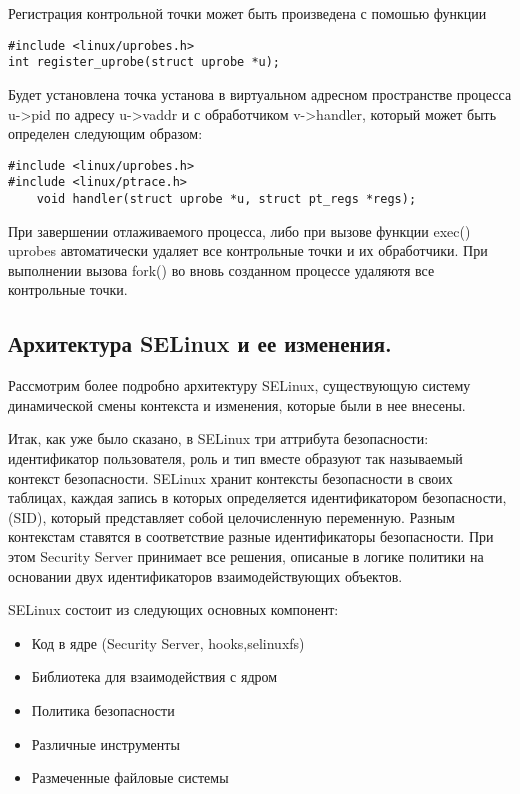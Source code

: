 Регистрация контрольной точки может быть произведена с помошью функции
 

\bigskip 
\begin{lstlisting}
#include <linux/uprobes.h>
int register_uprobe(struct uprobe *u); 
\end{lstlisting}

Будет установлена точка установа в виртуальном адресном пространстве 
процесса u->pid по адресу u->vaddr и с обработчиком v->handler, который
 может быть определен следующим образом: 

\begin{lstlisting}
#include <linux/uprobes.h>
#include <linux/ptrace.h>
	void handler(struct uprobe *u, struct pt_regs *regs);
\end{lstlisting}

\bigskip
При завершении отлаживаемого процесса, либо при вызове функции exec() 
uprobes автоматически удаляет все контрольные точки и их обработчики. 
При выполнении вызова fork() во вновь созданном процессе удаляютя все 
контрольные точки. 

\bigskip
\subsection{Архитектура SELinux и ее изменения.}

Рассмотрим более подробно архитектуру SELinux, существующую 
систему динамической смены контекста и изменения, которые были 
в нее внесены. 

Итак, как уже было сказано, в SELinux три аттрибута безопасности: 
идентификатор пользователя, роль и тип вместе образуют так называемый 
контекст безопасности. SELinux хранит контексты безопасности в своих 
таблицах, каждая запись в которых определяется идентификатором 
безопасности, (SID), который представляет собой целочисленную 
переменную. Разным контекстам ставятся в соответствие разные 
идентификаторы безопасности. При этом Security Server принимает все 
решения, описаные в логике политики на основании двух идентификаторов 
взаимодействующих объектов. 

SELinux состоит из следующих основных компонент:
\begin{itemize}
\item Код в ядре (Security Server, hooks,selinuxfs)
\item Библиотека для взаимодействия с ядром
\item Политика безопасности
\item Различные инструменты
\item Размеченные файловые системы
\end{itemize}

